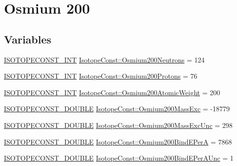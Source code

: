 \hypertarget{group___isotope_const-_osmium-_os200}{}\section{Osmium 200}
\label{group___isotope_const-_osmium-_os200}
\subsection*{Variables}
\begin{DoxyCompactItemize}
\item 
\mbox{\hyperlink{group___isotope_const-_macros_ga5f18360b3e99483a35c32d789e62621c}{I\+S\+O\+T\+O\+P\+E\+C\+O\+N\+S\+T\+\_\+\+I\+NT}} \mbox{\hyperlink{group___isotope_const-_osmium-_os200_gac423d0957405f39f480ca69e1b0288e0}{Isotope\+Const\+::\+Osmium200\+Neutrons}} = 124
\item 
\mbox{\hyperlink{group___isotope_const-_macros_ga5f18360b3e99483a35c32d789e62621c}{I\+S\+O\+T\+O\+P\+E\+C\+O\+N\+S\+T\+\_\+\+I\+NT}} \mbox{\hyperlink{group___isotope_const-_osmium-_os200_ga6ffdf7ce7bc0f0890f05f348e34edfba}{Isotope\+Const\+::\+Osmium200\+Protons}} = 76
\item 
\mbox{\hyperlink{group___isotope_const-_macros_ga5f18360b3e99483a35c32d789e62621c}{I\+S\+O\+T\+O\+P\+E\+C\+O\+N\+S\+T\+\_\+\+I\+NT}} \mbox{\hyperlink{group___isotope_const-_osmium-_os200_ga8698afb82302d82bbf7c76192c2ba3e5}{Isotope\+Const\+::\+Osmium200\+Atomic\+Weight}} = 200
\item 
\mbox{\hyperlink{group___isotope_const-_macros_ga8f45a7272ce02c0b4c65c44636ed719a}{I\+S\+O\+T\+O\+P\+E\+C\+O\+N\+S\+T\+\_\+\+D\+O\+U\+B\+LE}} \mbox{\hyperlink{group___isotope_const-_osmium-_os200_ga2448a9a6d133a0617db975e3f9a20642}{Isotope\+Const\+::\+Osmium200\+Mass\+Exc}} = -\/18779
\item 
\mbox{\hyperlink{group___isotope_const-_macros_ga8f45a7272ce02c0b4c65c44636ed719a}{I\+S\+O\+T\+O\+P\+E\+C\+O\+N\+S\+T\+\_\+\+D\+O\+U\+B\+LE}} \mbox{\hyperlink{group___isotope_const-_osmium-_os200_ga1b733bedee4ef5edfb8dc3ca0e1aee6f}{Isotope\+Const\+::\+Osmium200\+Mass\+Exc\+Unc}} = 298
\item 
\mbox{\hyperlink{group___isotope_const-_macros_ga8f45a7272ce02c0b4c65c44636ed719a}{I\+S\+O\+T\+O\+P\+E\+C\+O\+N\+S\+T\+\_\+\+D\+O\+U\+B\+LE}} \mbox{\hyperlink{group___isotope_const-_osmium-_os200_ga1ae0e75ac2204bef7bb636d85d60918b}{Isotope\+Const\+::\+Osmium200\+Bind\+E\+PerA}} = 7868
\item 
\mbox{\hyperlink{group___isotope_const-_macros_ga8f45a7272ce02c0b4c65c44636ed719a}{I\+S\+O\+T\+O\+P\+E\+C\+O\+N\+S\+T\+\_\+\+D\+O\+U\+B\+LE}} \mbox{\hyperlink{group___isotope_const-_osmium-_os200_ga9fc6f0bfe4c0499a457bedae76059c9d}{Isotope\+Const\+::\+Osmium200\+Bind\+E\+Per\+A\+Unc}} = 1

\end{DoxyCompactItemize}

